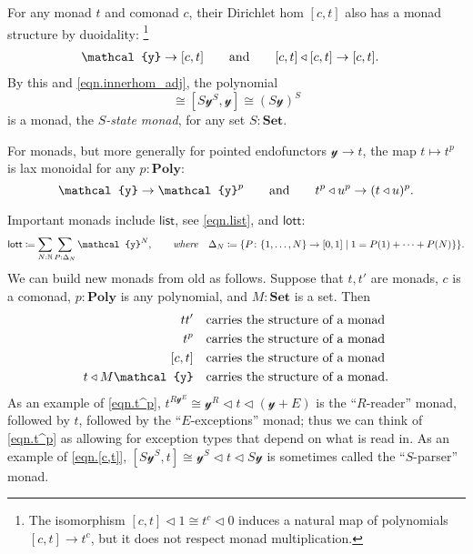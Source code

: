 \documentclass[11pt, one side, article]{memoir}
\theoremstyle{definition}
\theoremstyle{plain}
\newcommand{\Cat}[1]{\mathbf{#1}}%
\newcommand{\Fun}[1]{\mathsf{#1}}%
\newcommand{\tn}[1]{\textnormal{#1}}
\newcommand{\nn}{\mathbb{N}}
\newcommand{\smset}{\Cat{Set}}
\newcommand{\List}{\Fun{list}}
\newcommand{\lott}{\Fun{lott}}
\newcommand{\yon}{{\mathcal{y}}}
\newcommand{\poly}{\Cat{Poly}}
\newcommand{\0}{\textsf{0}}
\newcommand{\1}{\tn{\textsf{1}}}
\newcommand{\tri}{\mathbin{\triangleleft}}
\newcommand{\hh}[2][]{#1 \tn{#2} #1}
\newcommand{\qqand}{\hh[\qquad]{and}}
\newcommand{\hi}[4][]{#1 #2 \tn{\textit{#4}} #3}
\newcommand{\where}[1][,]{\hi[#1]{\qquad}{\quad}{where}}
\begin{document}
For any monad $t$ and comonad $c$, their Dirichlet hom $[c,t]$ also has a monad structure by duoidality:%
\footnote{The isomorphism $[c,t]\tri 1\cong t^c\tri 0$ induces a natural map of polynomials $[c,t]\to t^c$, but it does not respect monad multiplication.}
\begin{align}
	\yon\to[c,t]
	&\qqand
	[c,t]\tri[c,t]\to[c,t].
\end{align}
By this and \eqref{eqn.innerhom_adj}, the polynomial
\begin{equation}
	[S\yon,S\yon]\cong [S\yon^S,\yon]\cong (S\yon)^S
\end{equation}
is a monad, the \emph{$S$-state monad}, for any set $S:\smset$.

For monads, but more generally for pointed endofunctors $\yon\to t$, the map $t\mapsto t^p$ is lax monoidal for any $p:\poly$:
\begin{equation}
	\yon\to\yon^p
	\qqand
	t^p\tri u^p\to(t\tri u)^p.
\end{equation}

Important monads include $\List$, see \eqref{eqn.list}, and $\lott$:
\begin{equation}
	\lott\coloneqq\sum_{N:\nn}\sum_{P:\Delta_N}\yon^N
	\where
	\Delta_N\coloneqq\{P\colon\{1,\ldots,N\}\to[0,1]\mid1=P(1)+\cdots+P(N)\}\}.
\end{equation}
We can build new monads from old as follows. Suppose that $t,t'$ are monads, $c$ is a comonad, $p:\poly$ is any polynomial, and $M:\smset$ is a set. Then
\begin{align}
	tt'&\quad\tn{carries the structure of a monad}\\
	\label{eqn.t^p}
	t^p&\quad\tn{carries the structure of a monad}\\
	\label{eqn.[c,t]}
	[c,t]&\quad\tn{carries the structure of a monad}\\
	t\tri M\yon&\quad\tn{carries the structure of a monad}.
\end{align}
As an example of \eqref{eqn.t^p}, $t^{R\yon^E}\cong\yon^R\tri t\tri(\yon+E)$ is the ``$R$-reader'' monad, followed by $t$, followed by the ``$E$-exceptions'' monad; thus we can think of \eqref{eqn.t^p} as allowing for exception types that depend on what is read in. As an example of \eqref{eqn.[c,t]}, $[S\yon^S,t]\cong\yon^S\tri t\tri S\yon$ is sometimes called the ``$S$-parser'' monad.
\end{document}
